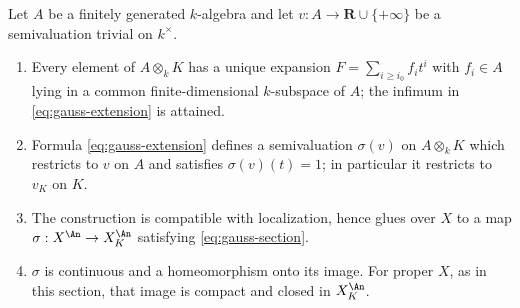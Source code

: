 \begin{theorem}
\label{thm:ch30-gauss-well-defined}
Let $A$ be a finitely generated $k$-algebra and let
$v:A\to\mathbf R\cup\{+\infty\}$ be a semivaluation trivial on
$k^\times$.
\begin{enumerate}
\item\label{itm:ch30-gw:expansion}
Every element of $A\otimes_kK$ has a unique expansion
$F=\sum_{i\geq i_0}f_it^i$ with $f_i\in A$ lying in a common
finite-dimensional $k$-subspace of $A$; the infimum in
\eqref{eq:gauss-extension} is attained.
\item\label{itm:ch30-gw:semival}
Formula \eqref{eq:gauss-extension} defines a semivaluation
$\sigma(v)$ on $A\otimes_kK$ which restricts to $v$ on $A$ and
satisfies $\sigma(v)(t)=1$; in particular it restricts to $v_K$ on
$K$.
\item\label{itm:ch30-gw:glue}
The construction is compatible with localization, hence glues over $X$
to a map $\sigma:X^{\An}\to X_K^{\An}$ satisfying
\eqref{eq:gauss-section}.
\item\label{itm:ch30-gw:cont}
$\sigma$ is continuous and a homeomorphism onto its image.
For proper $X$, as in this section, that image is compact and closed
in $X_K^{\An}$.
\end{enumerate}
\end{theorem}

